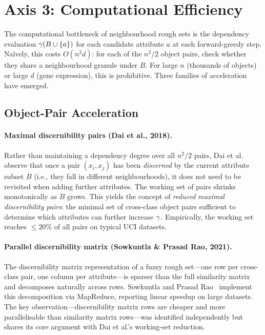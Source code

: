 \section{Axis 3: Computational Efficiency}
\label{sec:efficiency}

The computational bottleneck of neighbourhood rough sets is the dependency
evaluation $\gamma(B \cup \{a\})$ for each candidate attribute $a$ at each
forward-greedy step.  Na\"ively, this costs $O(n^2 d)$: for each of the
$n^2/2$ object pairs, check whether they share a neighbourhood granule
under $B$.  For large $n$ (thousands of objects) or large $d$ (gene expression),
this is prohibitive.  Three families of acceleration have emerged.

\subsection{Object-Pair Acceleration}
\label{sec:pair_accel}

\paragraph{Maximal discernibility pairs (Dai et al., 2018).}
Rather than maintaining a dependency degree over all $n^2/2$ pairs, Dai et
al.~\cite{Dai2018TFS} observe that once a pair $(x_i, x_j)$ has been
\emph{discerned} by the current attribute subset $B$ (i.e., they fall in
different neighbourhoods), it does not need to be revisited when adding
further attributes.  The working set of pairs shrinks monotonically as $B$
grows.  This yields the concept of \emph{reduced maximal discernibility
pairs}: the minimal set of cross-class object pairs sufficient to determine
which attributes can further increase $\gamma$.  Empirically, the working set
reaches $\leq 20\%$ of all pairs on typical UCI datasets.

\paragraph{Parallel discernibility matrix (Sowkuntla \& Prasad Rao, 2021).}
The discernibility matrix representation of a fuzzy rough set---one row per
cross-class pair, one column per attribute---is sparser than the full
similarity matrix and decomposes naturally across rows.
Sowkuntla and Prasad Rao~\cite{Sowkuntla2021DARA} implement this decomposition
via MapReduce, reporting linear speedup on large datasets.  The key observation---discernibility
matrix rows are cheaper and more parallelisable than similarity matrix rows---was
identified independently but shares its core argument with Dai et al.'s
working-set reduction.

